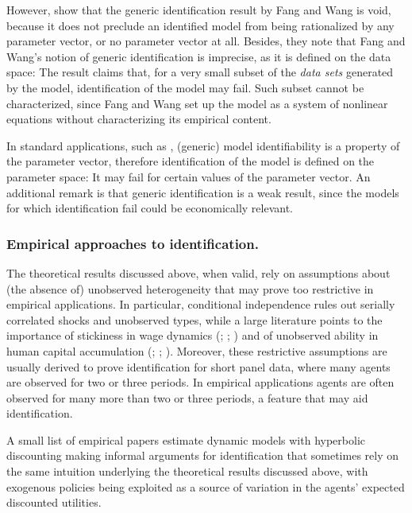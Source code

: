 However, \textcite{AbbringDaljord2020-1} show that the generic identification result by Fang and Wang is void, because it does not preclude an identified model from being rationalized by any parameter vector, or no parameter vector at all. Besides, they note that Fang and Wang's notion of generic identification is imprecise, as it is defined on the data space: The result claims that, for a very small subset of the \textit{data sets} generated by the model, identification of the model may fail. Such subset cannot be characterized, since Fang and Wang set up the model as a system of nonlinear equations without characterizing its empirical content.

In standard applications, such as \textcite{Ekeland2004}, (generic) model identifiability is a property of the parameter vector, therefore identification of the model is defined on the parameter space: It may fail for certain values of the parameter vector. An additional remark is that generic identification is a weak result, since the models for which identification fail could be economically relevant.

\subsubsection{Empirical approaches to identification.}

The theoretical results discussed above, when valid, rely on assumptions about (the absence of) unobserved heterogeneity that may prove too restrictive in empirical applications. In particular, conditional independence rules out serially correlated shocks and unobserved types, while a large literature points to the importance of stickiness in wage dynamics (\cite{Campbell1997}; \cite{LeBihan2012}; \cite{Barattieri2014}) and of unobserved ability in human capital accumulation (\cite{Weiss1995}; \cite{KeaneWolpin1997}; \cite{Belzil2002}). Moreover, these restrictive assumptions are usually derived to prove identification for short panel data, where many agents are observed for two or three periods. In empirical applications agents are often observed for many more than two or three periods, a feature that may aid identification.

A small list of empirical papers estimate dynamic models with hyperbolic discounting making informal arguments for identification that sometimes rely on the same intuition underlying the theoretical results discussed above, with exogenous policies being exploited as a source of variation in the agents' expected discounted utilities. 

